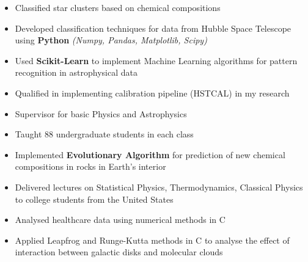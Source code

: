 \documentclass[10pt,a4paper]{altacv}
\begin{document}
\begin{itemize}
\item Classified star clusters based on chemical compositions    
\item Developed classification techniques for data from Hubble Space Telescope using \textbf{Python} \textit{(Numpy, Pandas, Matplotlib, Scipy)} 
\item Used \textbf{Scikit-Learn}  to implement Machine Learning algorithms for pattern recognition in astrophysical data 
\item Qualified in implementing calibration pipeline (HSTCAL) in my research 
\end{itemize}
\divider
{}
\begin{itemize}
\item Supervisor for basic Physics and Astrophysics  
\item Taught 88 undergraduate students in each class
\end{itemize}
\divider
{}
\begin{itemize}
\item Implemented \textbf{Evolutionary Algorithm} for prediction of new chemical compositions in rocks in Earth's interior
\end{itemize}
\divider
{}
\begin{itemize}
\item Delivered lectures on Statistical Physics, Thermodynamics, Classical Physics to college students from the United States 
\end{itemize}
\divider
{}
\begin{itemize}
\item Analysed healthcare data using numerical methods in C
\end{itemize}
\begin{itemize}
\item Applied Leapfrog and Runge-Kutta methods in C to analyse the effect of interaction between galactic disks and molecular clouds
\end{itemize}
\vspace{0.05cm}
\end{document}
